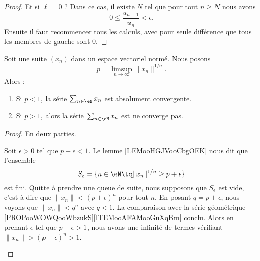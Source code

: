 \begin{proof}
	Et si \( \ell=0\) ? Dans ce cas, il existe \( N\) tel que pour tout \( n\geq N\) nous avons
	\begin{equation}
		0\leq \frac{ u_{n+1} }{ u_n }<\epsilon.
	\end{equation}
	Ensuite il faut recommencer tous les calculs, avec pour seule différence que tous les membres de gauche sont \( 0\).
\end{proof}


\begin{lemma}        \label{LEMooDWNZooXwejrF}
	Soit une suite \( (x_n)\) dans un espace vectoriel normé. Nous posons
	\begin{equation}
		p=\limsup_{n\to \infty}\| x_n \|^{1/n}.
	\end{equation}
	Alors :
	\begin{enumerate}
		\item       \label{ITEMooZZBIooUYrtYL}
		      Si \( p<1\), la série \( \sum_{n\in \eN}x_n\) est absolument convergente.
		\item       \label{ITEMooQGKNooOFeFRd}
		      Si \( p>1\), alors la série \( \sum_{n\in \eN}x_n\) est ne converge pas.
	\end{enumerate}
\end{lemma}

\begin{proof}
	En deux parties.
	\begin{subproof}
		Soit \( \epsilon>0\) tel que \( p+\epsilon<1\). Le lemme \ref{LEMooHGJVooCbgOEK} nous dit que l'ensemble
		\begin{equation}
			S_{\epsilon}=\{ n\in \eN\tq \| x_n \|^{1/n}\geq p+\epsilon \}
		\end{equation}
		est fini. Quitte à prendre une queue de suite, nous supposons que \( S_{\epsilon}\) est vide, c'est à dire que \( \| x_n \|<(p+\epsilon)^n\) pour tout \( n\). En posant \( q=p+\epsilon\), nous voyons que \( \| x_n \|<q^n\) avec \( q<1\). La comparaison avec la série géométrique \ref{PROPooWOWQooWbzukS}\ref{ITEMooAFAMooGuXqBm} conclu.
		Alors en prenant \( \epsilon\) tel que \( p-\epsilon>1\), nous avons une infinité de termes vérifiant \( \| x_n \|>(p-\epsilon)^n>1\).
	\end{subproof}
\end{proof}

